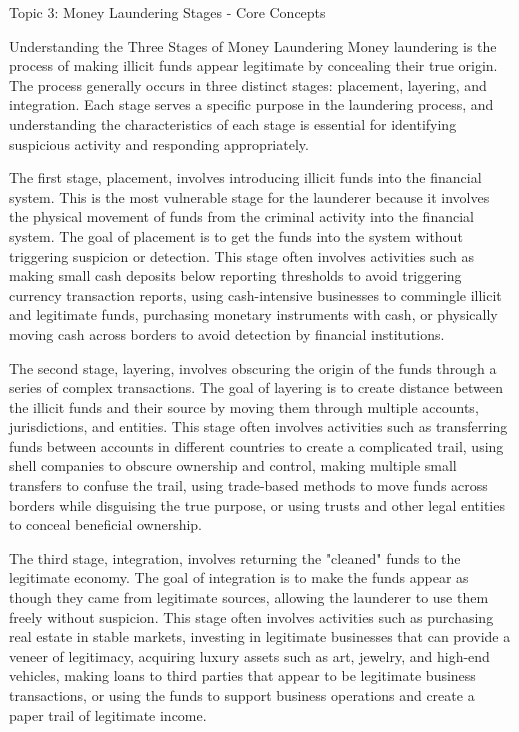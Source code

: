 \documentclass[5pt]{beamer}
\begin{document}
	\begin{frame}{Topic 3: Money Laundering Stages - Core Concepts}
		\begin{block}{\tiny Understanding the Three Stages of Money Laundering}
			\tiny Money laundering is the process of making illicit funds appear legitimate by concealing their true origin. The process generally occurs in three distinct stages: placement, layering, and integration. Each stage serves a specific purpose in the laundering process, and understanding the characteristics of each stage is essential for identifying suspicious activity and responding appropriately.
			
			The first stage, placement, involves introducing illicit funds into the financial system. This is the most vulnerable stage for the launderer because it involves the physical movement of funds from the criminal activity into the financial system. The goal of placement is to get the funds into the system without triggering suspicion or detection. This stage often involves activities such as making small cash deposits below reporting thresholds to avoid triggering currency transaction reports, using cash-intensive businesses to commingle illicit and legitimate funds, purchasing monetary instruments with cash, or physically moving cash across borders to avoid detection by financial institutions.
			
			The second stage, layering, involves obscuring the origin of the funds through a series of complex transactions. The goal of layering is to create distance between the illicit funds and their source by moving them through multiple accounts, jurisdictions, and entities. This stage often involves activities such as transferring funds between accounts in different countries to create a complicated trail, using shell companies to obscure ownership and control, making multiple small transfers to confuse the trail, using trade-based methods to move funds across borders while disguising the true purpose, or using trusts and other legal entities to conceal beneficial ownership.
			
			The third stage, integration, involves returning the "cleaned" funds to the legitimate economy. The goal of integration is to make the funds appear as though they came from legitimate sources, allowing the launderer to use them freely without suspicion. This stage often involves activities such as purchasing real estate in stable markets, investing in legitimate businesses that can provide a veneer of legitimacy, acquiring luxury assets such as art, jewelry, and high-end vehicles, making loans to third parties that appear to be legitimate business transactions, or using the funds to support business operations and create a paper trail of legitimate income.
		\end{block}
		

\end{frame}
\end{document}
